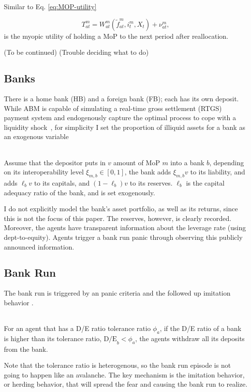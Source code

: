 Similar to Eq. \ref{eq:MOP-utility}

\begin{equation}
   \label{eq:POR-utility}
   T^m_{at} = W^m_{at}(\tilde{f}^m_{at}, i^m_t, X_t) + \nu^m_{at} ,
\end{equation}
is the myopic utility of holding a MoP to the next period after reallocation.

\begin{center}
   (To be continued)
   (Trouble deciding what to do)
\end{center}

\subsection{Banks}

There is a home bank (HB) and a foreign bank (FB); each has its own deposit.
While ABM is capable of simulating a real-time gross settlement (RTGS) payment
system and endogenously capture the optimal process to cope with a liquidity
shock~\citep*{GS08-ABM-Payment}, for simplicity I set the proportion of illiquid
assets for a bank as an exogenous variable

\begin{definition}
   \phantom{}\\
   Assume that the depositor puts in $v$ amount of MoP $m$ into a bank $b$,
   depending on its interoperability level $\xi_{m, b}\in [0,1]$, the bank adds
   $\xi_{m,b}v$ to its liability, and adds $\ell_b v$ to its capitals, and
   $(1-\ell_b) v$ to its reserves. $\ell_b$ is the capital adequacy ratio of the
   bank, and is set exogenously.
\end{definition}

I do not explicitly model the bank's asset portfolio, as well as its returns,
since this is not the focus of this paper. The reserves, however, is clearly
recorded. Moreover, the agents have transparent information about the leverage
rate (using dept-to-equity). Agents trigger a bank run panic through observing
this publicly announced information.

\subsection{Bank Run}

The bank run is triggered by an panic criteria and the followed up imitation behavior \citep*{Santos2021}.

\begin{definition}
   \phantom{}\\
   For an agent that has a D/E ratio tolerance ratio $\phi_a$, if the D/E ratio
   of a bank is higher than its tolerance ratio, $\mathrm{D/E}_b < \phi_a$, the
   agents withdraw all its deposits from the bank.
\end{definition}
Note that the tolerance ratio is heterogenous, so the bank run episode is not
going to happen like an avalanche. The key mechanism is the imitation behavior,
or herding behavior, that will spread the fear and causing the bank run to
realize.

